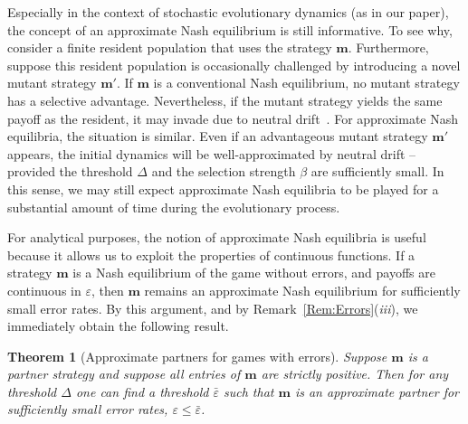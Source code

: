 \documentclass[9pt,twoside,lineno]{pnas-new}
\theoremstyle{plainCl1}
\newtheorem{theorem}{Theorem}
\theoremstyle{plainCl2}
\begin{document}
Especially in the context of stochastic evolutionary dynamics (as in our paper), the concept of an approximate Nash equilibrium is still informative. 
To see why, consider a finite resident population that uses the strategy $\mathbf{m}$. 
Furthermore, suppose this resident population is occasionally challenged by introducing a novel mutant strategy $\mathbf{m'}$. 
If $\mathbf{m}$ is a conventional Nash equilibrium, no mutant strategy has a selective advantage. 
Nevertheless, if the mutant strategy yields the same payoff as the resident, it may invade due to neutral drift~\citep{garcia:jet:2016}. 
For approximate Nash equilibria, the situation is similar. 
Even if an advantageous mutant strategy $\mathbf{m'}$ appears, the initial dynamics will be well-approximated by neutral drift -- provided the threshold $\Delta$ and the selection strength $\beta$ are sufficiently small. 
In this sense, we may still expect approximate Nash equilibria to be played for a substantial amount of time during the evolutionary process. 

For analytical purposes, the notion of approximate Nash equilibria is useful because it allows us to exploit the properties of continuous functions. 
If a strategy $\mathbf{m}$ is a Nash equilibrium of the game without errors, and payoffs are continuous in $\varepsilon$, then $\mathbf{m}$ remains an approximate Nash equilibrium for sufficiently small error rates. By this argument, and by Remark~\ref{Rem:Errors}({\it iii}), we immediately obtain the following result. 

\begin{theorem}[Approximate partners for games with errors] \label{Thm:ApproxPartners}
Suppose $\mathbf{m}$ is a partner strategy and suppose all entries of $\mathbf{m}$ are strictly positive. 
Then for any threshold $\Delta$ one can find a threshold $\bar{\varepsilon}$ such that $\mathbf{m}$ is an approximate partner for sufficiently small error rates, $\varepsilon\!\le\!\bar{\varepsilon}$. 
\end{theorem}
\end{document}
